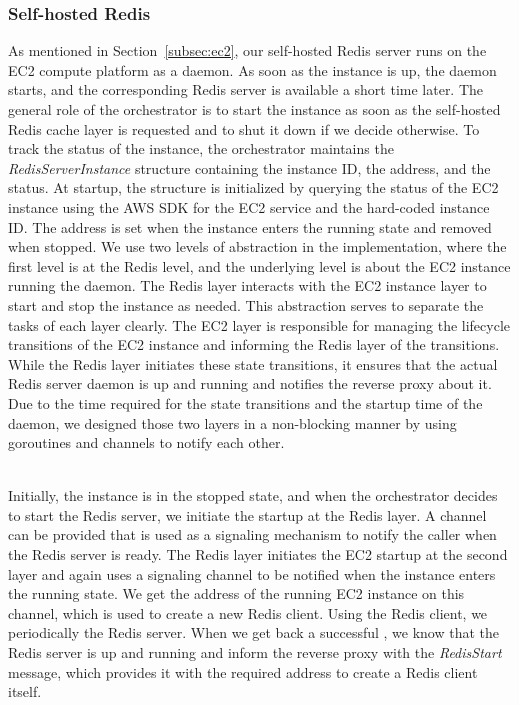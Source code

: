 \subsubsection{Self-hosted Redis} 
As mentioned in Section~\ref{subsec:ec2}, our self-hosted Redis server runs on the EC2 compute platform as a daemon. As soon as the instance is up, the daemon starts, and the corresponding Redis server is available a short time later. The general role of the orchestrator is to start the instance as soon as the self-hosted Redis cache layer is requested and to shut it down if we decide otherwise. To track the status of the instance, the orchestrator maintains the \emph{RedisServerInstance} structure containing the instance ID, the address, and the status. At startup, the structure is initialized by querying the status of the EC2 instance using the AWS SDK for the EC2 service and the hard-coded instance ID. The address is set when the instance enters the running state and removed when stopped. We use two levels of abstraction in the implementation, where the first level is at the Redis level, and the underlying level is about the EC2 instance running the daemon. The Redis layer interacts with the EC2 instance layer to start and stop the instance as needed. This abstraction serves to separate the tasks of each layer clearly. The EC2 layer is responsible for managing the lifecycle transitions of the EC2 instance and informing the Redis layer of the transitions. While the Redis layer initiates these state transitions, it ensures that the actual Redis server daemon is up and running and notifies the reverse proxy about it. Due to the time required for the state transitions and the startup time of the daemon, we designed those two layers in a non-blocking manner by using goroutines and channels to notify each other.

~\\
Initially, the instance is in the stopped state, and when the orchestrator decides to start the Redis server, we initiate the startup at the Redis layer. A channel can be provided that is used as a signaling mechanism to notify the caller when the Redis server is ready. The Redis layer initiates the EC2 startup at the second layer and again uses a signaling channel to be notified when the instance enters the running state. We get the address of the running EC2 instance on this channel, which is used to create a new Redis client. Using the Redis client, we periodically  the Redis server. When we get back a successful , we know that the Redis server is up and running and inform the reverse proxy with the \emph{RedisStart} message, which provides it with the required address to create a Redis client itself.

